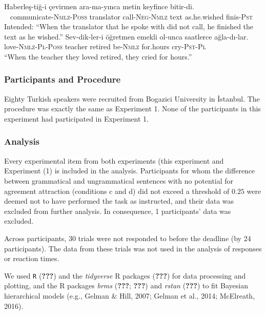 \documentclass[doc]{apa6}
\begin{document}
\begin{exe}
\ex
\begin{xlist}
\ex \label{filler1a}
\gll * Haberleş-tiğ-i çevirmen ara-ma-yınca metin keyfince bitir-di.\\
{\ } communicate-\textsc{Nmlz}-\textsc{Poss} translator call-\textsc{Neg}-\textsc{Nmlz} text as.he.wished finis-\textsc{Pst}\\
\glt Intended: ``When the translator that he spoke with did not call, he finished the text as he wished.''
\ex \label{filler1b}
\gll Sev-dik-ler-i öğretmen emekli ol-unca saatlerce ağla-dı-lar.\\
love-\textsc{Nmlz}-\textsc{Pl}-\textsc{Poss} teacher retired be-\textsc{Nmlz} for.hours cry-\textsc{Pst}-\textsc{Pl}\\
\glt ``When the teacher they loved retired, they cried for hours.''
\end{xlist}
\end{exe}

\hypertarget{participants-and-procedure-1}{%
\subsubsection{Participants and Procedure}\label{participants-and-procedure-1}}

Eighty Turkish speakers were recruited from Bogazici University in İstanbul. The procedure was exactly the same as Experiment 1. None of the participants in this experiment had participated in Experiment 1.

\hypertarget{analysis}{%
\subsubsection{Analysis}\label{analysis}}

Every experimental item from both experiments (this experiment and Experiment (1) is included in the analysis.
Participants for whom the difference between grammatical and ungrammatical sentences with no potential for agreement attraction (conditions c and d) did not exceed a threshold of \(0.25\) were deemed not to have performed the task as instructed, and their data was excluded from further analysis. In consequence, 1 participants' data was excluded.

Across participants, 30 trials were not responded to before the deadline (by 24 participants). The data from these trials was not used in the analysis of responses or reaction times.

We used \texttt{R} ({\textbf{???}}) and the \emph{tidyverse} R packages ({\textbf{???}}) for data processing and plotting, and the R packages \emph{brms} ({\textbf{???}}; {\textbf{???}}) and \emph{rstan} ({\textbf{???}}) to fit Bayesian hierarchical models (e.g., Gelman \& Hill, 2007; Gelman et al., 2014; McElreath, 2016).
\end{document}

